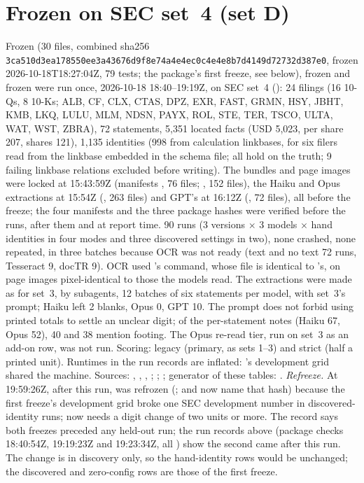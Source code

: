 \section{Frozen  on SEC set~4 (set D)}\label{app:q9}
Frozen  (30 files, combined sha256 {\small\nolinkurl{3ca510d3ea178550ee3a43676d9f8e74a4e4ec0c4e4e8b7d4149d72732d387e0}}, frozen 2026-10-18T18:27:04Z, 79 tests; the package's first freeze, see below), frozen  and frozen  were run once, 2026-10-18 18:40--19:19Z, on SEC set~4 (): 24 filings (16 10-Qs, 8 10-Ks; ALB, CF, CLX, CTAS, DPZ, EXR, FAST, GRMN, HSY, JBHT, KMB, LKQ, LULU, MLM, NDSN, PAYX, ROL, STE, TER, TSCO, ULTA, WAT, WST, ZBRA), 72 statements, 5,351 located facts (USD 5,023, per share 207, shares 121), 1,135 identities (998 from calculation linkbases, for six filers read from the linkbase embedded in the schema file; all hold on the truth; 9 failing linkbase relations excluded before writing). The bundles and page images were locked at 15:43:59Z (manifests , 76 files; , 152 files), the Haiku and Opus extractions at 15:54Z (, 263 files) and GPT's at 16:12Z (, 72 files), all before the freeze; the four manifests and the three package hashes were verified before the runs, after them and at report time. 90 runs (3 versions $\times$ 3 models $\times$ hand identities in four modes and three discovered settings in two), none crashed, none repeated, in three batches because OCR was not ready (text and no text 72 runs, Tesseract 9, docTR 9). OCR used 's  command, whose file is identical to 's, on page images pixel-identical to those the models read. The extractions were made as for set~3, by subagents, 12 batches of six statements per model, with set~3's prompt; Haiku left 2 blanks, Opus 0, GPT 10. The prompt does not forbid using printed totals to settle an unclear digit; of the per-statement notes (Haiku 67, Opus 52), 40 and 38 mention footing. The Opus re-read tier, run on set~3 as an add-on row, was not run. Scoring: legacy (primary, as sets 1--3) and strict (half a printed unit). Runtimes in the run records are inflated: 's development grid shared the machine. Sources: , , , ; ; ; generator of these tables: . \emph{Refreeze.} At 19:59:26Z, after this run,  was refrozen (;  and  now name that hash) because the first freeze's development grid broke one SEC development number in discovered-identity runs;  now needs a digit change of two units or more. The record says both freezes preceded any held-out run; the run records above (package checks 18:40:54Z, 19:19:23Z and 19:23:34Z, all ) show the second came after this run. The change is in discovery only, so the hand-identity rows would be unchanged; the discovered and zero-config rows are those of the first freeze.

